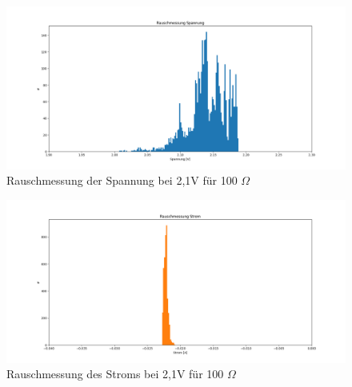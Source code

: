 \documentclass[12pt,a4paper]{article}
\begin{document}
\begin{figure}
\begin{center}
\includegraphics[scale=0.45]{Bilder/Rauschmessung_Spannung.png}
\end{center}
\caption[Rauschmessung Spannung]{Rauschmessung der Spannung bei 2,1V für 100 $\Omega$}
\label{fig:Rauschmessung_Spannung}
\end{figure}

\begin{figure}
\begin{center}
\includegraphics[scale=0.45]{Bilder/Rauschmessung_Strom.png}
\end{center}
\caption[Rauschmessung Strom]{Rauschmessung des Stroms bei 2,1V für 100 $\Omega$}
\label{fig:Rauschmessung_Strom}
\end{figure}
\end{document}
